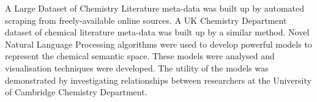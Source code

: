 A Large Dataset of Chemistry Literature meta-data was built up by automated scraping from freely-available online sources. A UK Chemistry Department dataset of chemical literature meta-data was built up by a similar method. Novel Natural Language Processing algorithms were used to develop powerful models to represent the chemical semantic space. These models were analysed and visualisation techniques were developed. The utility of the models was demonstrated by investigating relationships between researchers at the University of Cambridge Chemistry Department. 